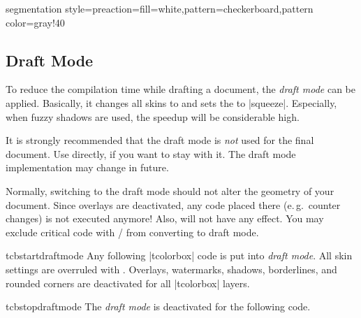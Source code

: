 \begin{dispExample*}{segmentation style={preaction={fill=white},pattern=checkerboard,pattern color=gray!40}}

\begin{mybox}
  \lipsum[2]
\end{mybox}
\end{dispExample*}


\clearpage
\subsection{Draft Mode}\label{subsec:draftmode}
To reduce the compilation time while drafting a document, the \emph{draft mode}
can be applied. Basically, it changes all skins to  and
sets the  to |squeeze|. Especially,
when fuzzy shadows are used, the speedup will be considerable high.

\begin{marker}
It is strongly recommended that the draft mode is \emph{not} used for the final document.
Use  directly, if you want to stay with it. The draft mode
implementation may change in future.
\end{marker}

\begin{marker}
Normally, switching to the draft mode should not alter the geometry of
your document. Since overlays are deactivated, any code placed there
(e.\,g.\ counter changes) is not executed anymore! Also, 
will not have any effect. You may exclude critical code with
 / 
from converting to draft mode.
\end{marker}


\begin{docCommand}{tcbstartdraftmode}{}
  Any following |tcolorbox| code is put into \emph{draft mode}. All skin
  settings are overruled with . Overlays, watermarks,
  shadows, borderlines, and rounded corners are deactivated for all |tcolorbox|
  layers.
\end{docCommand}

\begin{docCommand}{tcbstopdraftmode}{}
  The \emph{draft mode} is deactivated for the following code.
\end{docCommand}

